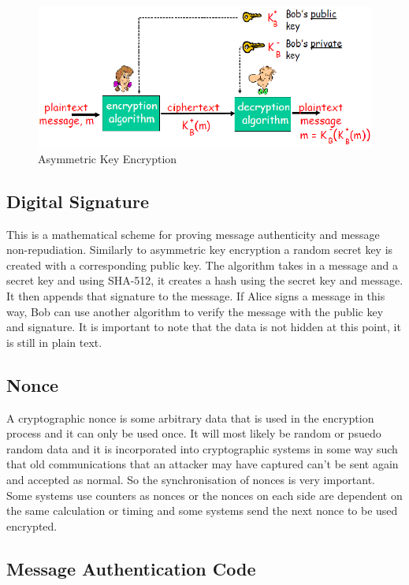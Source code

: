 \begin{figure}[H]
	\centering
	\includegraphics[width=1\linewidth]{Figures/publickeyex.png}
	\caption{Asymmetric Key Encryption}
	\label{fig:asy}
\end{figure}



\subsection{Digital Signature}

This is a mathematical scheme for proving message authenticity and message non-repudiation. Similarly to asymmetric key encryption a random secret key is created with a corresponding public key. The algorithm takes in a message and a secret key and using SHA-512, it creates a hash using the secret key and message. It then appends that signature to the message. If Alice signs a message in this way, Bob can use another algorithm to verify the message with the public key and signature. It is important to note that the data is not hidden at this point, it is still in plain text.

\subsection{Nonce}

A cryptographic nonce is some arbitrary data that is used in the encryption process and it can only be used once. It will most likely be random or psuedo random data and it is incorporated into cryptographic systems in some way such that old communications that an attacker may have captured can't be sent again and accepted as normal. So the synchronisation of nonces is very important. Some systems use counters as nonces or the nonces on each side are dependent on the same calculation or timing and some systems send the next nonce to be used encrypted.

\subsection{Message Authentication Code}


